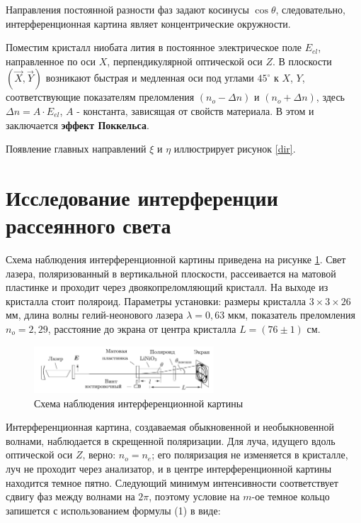 \documentclass[a4paper, 12pt]{article}%
\begin{document}
	
	Направления постоянной разности фаз задают косинусы $\cos\theta$, следовательно, интерференционная картина являет концентрические окружности. 
	
	Поместим кристалл ниобата лития в постоянное электрическое поле $E_{el}$, направленное по оси $X$, перпендикулярной оптической оси $Z$. В плоскости $(\overrightarrow{X}, \overrightarrow{Y})$ возникают быстрая и медленная оси под углами $45^\circ$ к $X$, $Y$, соответствующие показателям преломления $(n_o - \Delta n)$ и $(n_o + \Delta n)$, здесь $\Delta n = A\cdot E_{el}$, $A$ - константа, зависящая от свойств материала. В этом и заключается \textbf{эффект Поккельса}. 
	
	Появление главных направлений $\xi$ и $\eta$ иллюстрирует рисунок \ref{dir}. 
	
	\section{Исследование интерференции рассеянного света}
	
	Схема наблюдения интерференционной картины приведена на рисунке \ref{shema}. Свет лазера, поляризованный в вертикальной плоскости, рассеивается на матовой пластинке и проходит через двоякопреломляющий кристалл. На выходе из кристалла стоит поляроид. Параметры установки: размеры кристалла $3 \times 3 \times 26$ мм, длина волны гелий-неонового лазера $\lambda = 0,63$ мкм, показатель преломления $n_o = 2,29$, расстояние до экрана от центра кристалла $L = (76 \pm 1)$ см. 
	
	\begin{figure}[h]
		\centering	
		\includegraphics[width=0.6\textwidth]{shema.png}
		\caption{Схема наблюдения интерференционной картины}
		\label{shema}
	\end{figure}
	
	Интерференционная картина, создаваемая обыкновенной и необыкновенной волнами, наблюдается в скрещенной поляризации. Для луча, идущего вдоль оптической оси $Z$, верно: $n_o = n_e$; его поляризация не изменяется в кристалле, луч не проходит через анализатор, и в центре интерференционной картины находится темное пятно. Следующий минимум интенсивности соответствует сдвигу фаз между волнами на $2\pi$, поэтому условие на $m$-ое темное кольцо запишется с использованием формулы (1) в виде:
	
\end{document}
